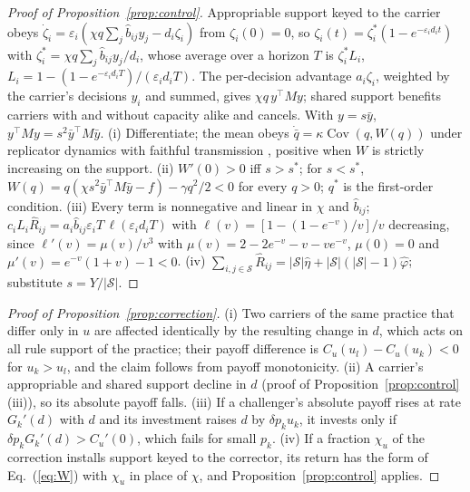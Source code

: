 \documentclass[letterpaper]{article} %
\theoremstyle{definition}
\newcommand{\cS}{\mathcal{S}}
\begin{document}
\begin{proof}[Proof of Proposition~\ref{prop:control}]
Appropriable support keyed to the carrier obeys $\dot\zeta_i=\varepsilon_i(\chi q\sum_j\hat b_{ij}y_j-d_i\zeta_i)$ from $\zeta_i(0)=0$, so $\zeta_i(t)=\zeta^\ast_i(1-e^{-\varepsilon_id_it})$ with $\zeta^\ast_i=\chi q\sum_j\hat b_{ij}y_j/d_i$, whose average over a horizon $T$ is $\zeta^\ast_iL_i$, $L_i=1-(1-e^{-\varepsilon_id_iT})/(\varepsilon_id_iT)$. The per-decision advantage $a_i\zeta_i$, weighted by the carrier's decisions $y_i$ and summed, gives $\chi q\,y^\top My$; shared support benefits carriers with and without capacity alike and cancels. With $y=s\bar y$, $y^\top My=s^2\bar y^\top M\bar y$. (i) Differentiate; the mean obeys $\dot{\bar q}=\kappa\operatorname{Cov}(q,W(q))$ under replicator dynamics with faithful transmission \citep{price1970}, positive when $W$ is strictly increasing on the support. (ii) $W'(0)>0$ iff $s>s^\ast$; for $s<s^\ast$, $W(q)=q(\chi s^2\bar y^\top M\bar y-f)-\gamma q^2/2<0$ for every $q>0$; $q^\ast$ is the first-order condition. (iii) Every term is nonnegative and linear in $\chi$ and $\hat b_{ij}$; $c_iL_i\hat R_{ij}=a_i\hat b_{ij}\varepsilon_iT\,\ell(\varepsilon_id_iT)$ with $\ell(v)=[1-(1-e^{-v})/v]/v$ decreasing, since $\ell'(v)=\mu(v)/v^3$ with $\mu(v)=2-2e^{-v}-v-ve^{-v}$, $\mu(0)=0$ and $\mu'(v)=e^{-v}(1+v)-1<0$. (iv) $\sum_{i,j\in\cS}\hat R_{ij}=|\cS|\hat\eta+|\cS|(|\cS|-1)\hat\varphi$; substitute $s=Y/|\cS|$.
\end{proof}

\begin{proof}[Proof of Proposition~\ref{prop:correction}]
(i) Two carriers of the same practice that differ only in $u$ are affected identically by the resulting change in $d$, which acts on all rule support of the practice; their payoff difference is $C_u(u_l)-C_u(u_k)<0$ for $u_k>u_l$, and the claim follows from payoff monotonicity. (ii) A carrier's appropriable and shared support decline in $d$ (proof of Proposition~\ref{prop:control}(iii)), so its absolute payoff falls. (iii) If a challenger's absolute payoff rises at rate $G_k'(d)$ with $d$ and its investment raises $d$ by $\delta p_ku_k$, it invests only if $\delta p_kG_k'(d)>C_u'(0)$, which fails for small $p_k$. (iv) If a fraction $\chi_u$ of the correction installs support keyed to the corrector, its return has the form of Eq.~(\ref{eq:W}) with $\chi_u$ in place of $\chi$, and Proposition~\ref{prop:control} applies.
\end{proof}
\end{document}
